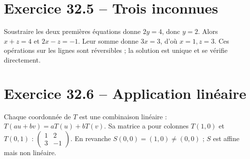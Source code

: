 \section*{Exercice 32.5 -- Trois inconnues}
Soustraire les deux premières équations donne $2y=4$, donc $y=2$. Alors $x+z=4$ et $2x-z=-1$. Leur somme donne $3x=3$, d'où $x=1,z=3$. Ces opérations sur les lignes sont réversibles ; la solution est unique et se vérifie directement.

\section*{Exercice 32.6 -- Application linéaire}
Chaque coordonnée de $T$ est une combinaison linéaire : $T(au+bv)=aT(u)+bT(v)$. Sa matrice a pour colonnes $T(1,0)$ et $T(0,1)$ : $\begin{pmatrix}1&2\\3&-1\end{pmatrix}$. En revanche $S(0,0)=(1,0)\ne(0,0)$ ; $S$ est affine mais non linéaire.
